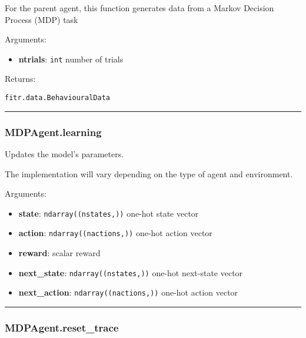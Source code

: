 For the parent agent, this function generates data from a Markov
Decision Process (MDP) task

Arguments:

\begin{itemize}
\tightlist
\item
  \textbf{ntrials}: \texttt{int} number of trials
\end{itemize}

Returns:

\texttt{fitr.data.BehaviouralData}

\begin{center}\rule{0.5\linewidth}{\linethickness}\end{center}

\subsubsection{MDPAgent.learning}\label{mdpagent.learning}

\begin{Shaded}
\begin{Highlighting}[]
\end{Highlighting}
\end{Shaded}

Updates the model's parameters.

The implementation will vary depending on the type of agent and
environment.

Arguments:

\begin{itemize}
\tightlist
\item
  \textbf{state}: \texttt{ndarray((nstates,))} one-hot state vector
\item
  \textbf{action}: \texttt{ndarray((nactions,))} one-hot action vector
\item
  \textbf{reward}: scalar reward
\item
  \textbf{next\_state}: \texttt{ndarray((nstates,))} one-hot next-state
  vector
\item
  \textbf{next\_action}: \texttt{ndarray((nactions,))} one-hot action
  vector
\end{itemize}

\begin{center}\rule{0.5\linewidth}{\linethickness}\end{center}

\subsubsection{MDPAgent.reset\_trace}\label{mdpagent.reset_trace}

